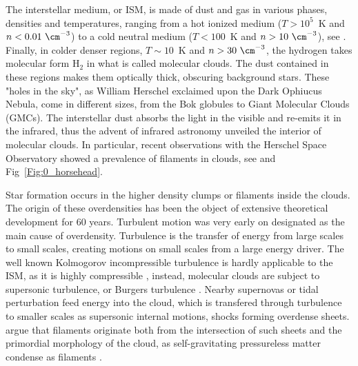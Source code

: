 The interstellar medium, or ISM, is made of dust and gas in various phases, densities and temperatures, ranging from a hot ionized medium ($T>10^5 $~K and $n < 0.01 ~\cm^{-3}$) to a cold neutral medium ($T<100$~K and $n > 10 ~\cm^{-3}$),  see \cite{Field1969}. Finally, in colder denser regions, $T\sim 10$~K and $n>30~\cm^{-3}$, the hydrogen takes molecular form H$_2$ in what is called molecular clouds. The dust contained in these regions makes them optically thick, obscuring background stars. These "holes in the sky", as William Herschel exclaimed upon the Dark Ophiucus Nebula\citep{Houghton1942}, come in different sizes, from the Bok globules to Giant Molecular Clouds (GMCs).
The interstellar dust absorbs the light in the visible and re-emits it in the infrared, thus the advent of infrared astronomy unveiled the interior of molecular clouds. In particular, recent observations with the Herschel Space Observatory showed a prevalence of filaments in clouds, see \cite{Andre2010} and Fig~\ref{Fig:0_horsehead}.

Star formation occurs in the higher density clumps or filaments inside the clouds. The origin of these overdensities has been the object of extensive theoretical development for 60 years. Turbulent motion was very early on designated as the main cause of overdensity. Turbulence is the transfer of energy from large scales to small scales, creating motions on small scales from a large energy driver. The well known Kolmogorov incompressible turbulence is hardly applicable to the ISM, as it is highly compressible \citep{Scalo1998}, instead, molecular clouds are subject to supersonic turbulence, or Burgers turbulence \citep{Frisch2001}. Nearby supernovas or tidal perturbation feed energy into the cloud, which is transfered through turbulence to smaller scales as supersonic internal motions, shocks forming overdense sheets. \cite{McKee2007} argue that filaments originate both from the intersection of such sheets and the primordial morphology of the cloud, as self-gravitating pressureless matter condense as filaments \citep{Springel2005}.

